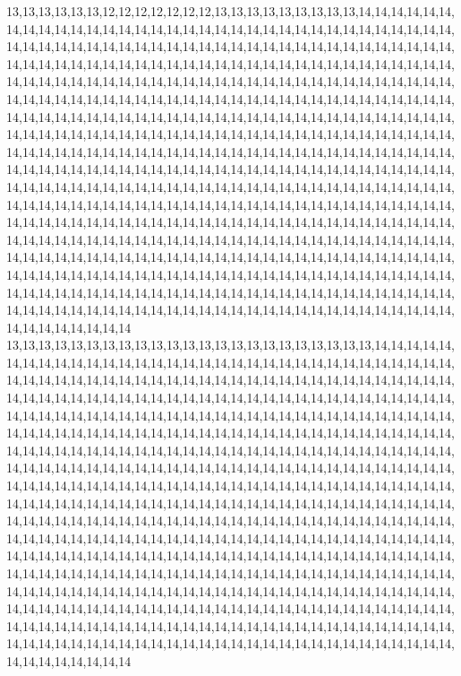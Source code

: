 13,13,13,13,13,13,12,12,12,12,12,12,12,13,13,13,13,13,13,13,13,13,14,14,14,14,14,14,14,14,14,14,14,14,14,14,14,14,14,14,14,14,14,14,14,14,14,14,14,14,14,14,14,14,14,14,14,14,14,14,14,14,14,14,14,14,14,14,14,14,14,14,14,14,14,14,14,14,14,14,14,14,14,14,14,14,14,14,14,14,14,14,14,14,14,14,14,14,14,14,14,14,14,14,14,14,14,14,14,14,14,14,14,14,14,14,14,14,14,14,14,14,14,14,14,14,14,14,14,14,14,14,14,14,14,14,14,14,14,14,14,14,14,14,14,14,14,14,14,14,14,14,14,14,14,14,14,14,14,14,14,14,14,14,14,14,14,14,14,14,14,14,14,14,14,14,14,14,14,14,14,14,14,14,14,14,14,14,14,14,14,14,14,14,14,14,14,14,14,14,14,14,14,14,14,14,14,14,14,14,14,14,14,14,14,14,14,14,14,14,14,14,14,14,14,14,14,14,14,14,14,14,14,14,14,14,14,14,14,14,14,14,14,14,14,14,14,14,14,14,14,14,14,14,14,14,14,14,14,14,14,14,14,14,14,14,14,14,14,14,14,14,14,14,14,14,14,14,14,14,14,14,14,14,14,14,14,14,14,14,14,14,14,14,14,14,14,14,14,14,14,14,14,14,14,14,14,14,14,14,14,14,14,14,14,14,14,14,14,14,14,14,14,14,14,14,14,14,14,14,14,14,14,14,14,14,14,14,14,14,14,14,14,14,14,14,14,14,14,14,14,14,14,14,14,14,14,14,14,14,14,14,14,14,14,14,14,14,14,14,14,14,14,14,14,14,14,14,14,14,14,14,14,14,14,14,14,14,14,14,14,14,14,14,14,14,14,14,14,14,14,14,14,14,14,14,14,14,14,14,14,14,14,14,14,14,14,14,14,14,14,14,14,14,14,14,14,14,14,14,14,14,14,14,14,14,14,14,14,14,14,14,14,14,14,14,14,14,14,14,14,14,14,14,14,14,14,14,14,14,14,14,14,14,14,14,14,14,14,14,14,14,14,14,14,14,14,14,14,14,14,14,14,14,14,14,14,14,14,14,14,14,14,14,14,14,14,14,14,14,14,14,14,14,14,14,14,14,14,14,14,14
13,13,13,13,13,13,13,13,13,13,13,13,13,13,13,13,13,13,13,13,13,13,13,14,14,14,14,14,14,14,14,14,14,14,14,14,14,14,14,14,14,14,14,14,14,14,14,14,14,14,14,14,14,14,14,14,14,14,14,14,14,14,14,14,14,14,14,14,14,14,14,14,14,14,14,14,14,14,14,14,14,14,14,14,14,14,14,14,14,14,14,14,14,14,14,14,14,14,14,14,14,14,14,14,14,14,14,14,14,14,14,14,14,14,14,14,14,14,14,14,14,14,14,14,14,14,14,14,14,14,14,14,14,14,14,14,14,14,14,14,14,14,14,14,14,14,14,14,14,14,14,14,14,14,14,14,14,14,14,14,14,14,14,14,14,14,14,14,14,14,14,14,14,14,14,14,14,14,14,14,14,14,14,14,14,14,14,14,14,14,14,14,14,14,14,14,14,14,14,14,14,14,14,14,14,14,14,14,14,14,14,14,14,14,14,14,14,14,14,14,14,14,14,14,14,14,14,14,14,14,14,14,14,14,14,14,14,14,14,14,14,14,14,14,14,14,14,14,14,14,14,14,14,14,14,14,14,14,14,14,14,14,14,14,14,14,14,14,14,14,14,14,14,14,14,14,14,14,14,14,14,14,14,14,14,14,14,14,14,14,14,14,14,14,14,14,14,14,14,14,14,14,14,14,14,14,14,14,14,14,14,14,14,14,14,14,14,14,14,14,14,14,14,14,14,14,14,14,14,14,14,14,14,14,14,14,14,14,14,14,14,14,14,14,14,14,14,14,14,14,14,14,14,14,14,14,14,14,14,14,14,14,14,14,14,14,14,14,14,14,14,14,14,14,14,14,14,14,14,14,14,14,14,14,14,14,14,14,14,14,14,14,14,14,14,14,14,14,14,14,14,14,14,14,14,14,14,14,14,14,14,14,14,14,14,14,14,14,14,14,14,14,14,14,14,14,14,14,14,14,14,14,14,14,14,14,14,14,14,14,14,14,14,14,14,14,14,14,14,14,14,14,14,14,14,14,14,14,14,14,14,14,14,14,14,14,14,14,14,14,14,14,14,14,14,14,14,14,14,14,14,14,14,14,14,14,14,14,14,14,14,14,14,14,14,14,14,14,14,14,14,14,14,14,14,14,14,14,14,14,14,14
